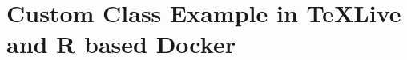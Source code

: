 \documentclass{custom-class}
\begin{document}
    \section{Custom Class Example in TeXLive and R based Docker}
\end{document}
